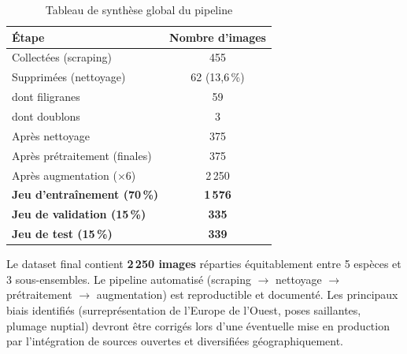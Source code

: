 \documentclass[12pt,a4paper]{article}
\begin{document}
\begin{table}[h!]
  \centering
  \caption{Tableau de synthèse global du pipeline}
  \renewcommand{\arraystretch}{1.4}
  \begin{tabular}{lc}
    \toprule
    \textbf{Étape} & \textbf{Nombre d'images} \\
    \midrule
    Collectées (scraping)              &  455 \\
    Supprimées (nettoyage)             &   62 \quad (13,6\,\%) \\
    \quad dont filigranes              &   59 \\
    \quad dont doublons                &    3 \\
    Après nettoyage                    &  375 \\
    Après prétraitement (finales)      &  375 \\
    Après augmentation ($\times 6$)    & 2\,250 \\
    \midrule
    \textbf{Jeu d'entraînement (70\,\%)} & \textbf{1\,576} \\
    \textbf{Jeu de validation (15\,\%)}  & \textbf{335} \\
    \textbf{Jeu de test (15\,\%)}        & \textbf{339} \\
    \bottomrule
  \end{tabular}
\end{table}

\vspace{1cm}

\begin{tcolorbox}[colback=success!10, colframe=success, title=\textbf{Conclusion}]
  Le dataset final contient \textbf{2\,250 images} réparties équitablement entre 5 espèces
  et 3 sous-ensembles. Le pipeline automatisé (scraping $\to$ nettoyage $\to$ prétraitement
  $\to$ augmentation) est reproductible et documenté. Les principaux biais identifiés
  (surreprésentation de l'Europe de l'Ouest, poses saillantes, plumage nuptial) devront
  être corrigés lors d'une éventuelle mise en production par l'intégration de sources
  ouvertes et diversifiées géographiquement.
\end{tcolorbox}
\end{document}
